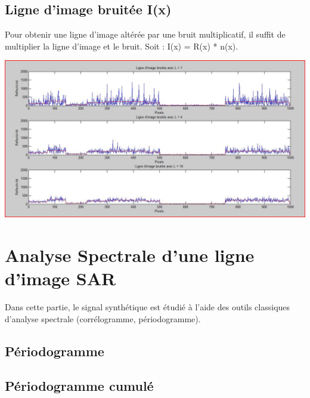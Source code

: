 \documentclass[a4paper,11pt]{article}
\newcommand{\FSource}[1]{%
  
  }
\begin{document}
\subsection{Ligne d'image bruitée I(x)}

Pour obtenir une ligne d'image altérée par une bruit multiplicatif, il suffit de multiplier la ligne d'image et le bruit. Soit :
I(x) = R(x) * n(x).

\includegraphics[width=15cm]{capture/ligne.JPG}

\newpage

\section{Analyse Spectrale d'une ligne d'image SAR}

Dans cette partie, le signal synthétique est étudié à l'aide des outils classiques d'analyse spectrale (corrélogramme, périodogramme).

\subsection{Périodogramme}


\vspace{0.5cm}

\FSource{matlab/3.m}

\vspace{0.5cm}

\subsection{Périodogramme cumulé}


\vspace{0.5cm}
\end{document}
